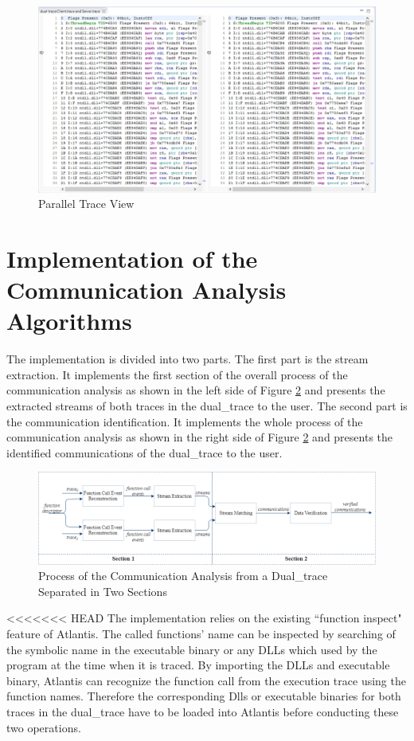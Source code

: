 \begin{figure}[H]
\centerline{\includegraphics[scale=0.6]{Figures/paralleleditor}}
 \caption{Parallel Trace View}
\label{parallelview}
\end{figure}

\section{Implementation of the Communication Analysis Algorithms}
The implementation is divided into two parts. The first part is the stream extraction. It implements the first section of the overall process of the communication analysis as shown in the left side of Figure \ref{overviewintwo} and presents the extracted streams of both traces in the dual\_trace to the user. The second part is the communication identification. It implements the whole process of the communication analysis as shown in the right side of Figure \ref{overviewintwo} and presents the identified communications of the dual\_trace to the user.

\begin{figure}[H]
\centerline{\includegraphics[scale=0.55]{Figures/overviewintwo}}
\caption{Process of the Communication Analysis from a Dual\_trace Separated in Two Sections}
\label{overviewintwo}
\end{figure}

<<<<<<< HEAD
The implementation relies on the existing ``function inspect" feature of Atlantis. The called functions' name can be inspected  by  searching of the symbolic name in the executable binary or any DLLs which used by the program at the time when it is traced. By importing the DLLs and executable binary, Atlantis can recognize the function call from the execution trace using the function names. Therefore the corresponding Dlls or executable binaries for both traces in the dual\_trace have to be loaded into Atlantis before conducting these two operations.

